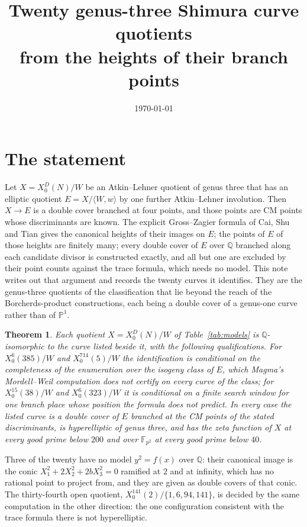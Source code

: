 \documentclass[11pt,reqno]{amsart}
\theoremstyle{plain}
\newtheorem{theorem}{Theorem}
\theoremstyle{definition}
\newcommand{\Q}{\mathbb{Q}}
\newcommand{\F}{\mathbb{F}}
\begin{document}
\title{Twenty genus-three Shimura curve quotients\\ from the heights of their branch points}
\author{}
\date{\today}
\maketitle

\section{The statement}

Let $X=X_0^D(N)/W$ be an Atkin--Lehner quotient of genus three that has an elliptic quotient
$E=X/\langle W,w\rangle$ by one further Atkin--Lehner involution. Then $X\to E$ is a double cover
branched at four points, and those points are CM points whose discriminants are known. The explicit
Gross--Zagier formula of Cai, Shu and Tian gives the canonical heights of their images on $E$; the
points of $E$ of those heights are finitely many; every double cover of $E$ over $\Q$ branched
along each candidate divisor is constructed exactly, and all but one are excluded by their point
counts against the trace formula, which needs no model. This note writes out that argument and
records the twenty curves it identifies. They are the genus-three quotients of the classification
that lie beyond the reach of the Borcherds-product constructions, each being a double cover of a
genus-one curve rather than of $\mathbb P^1$.

\begin{theorem}\label{thm:main}
Each quotient $X=X_0^D(N)/W$ of Table~\ref{tab:models} is $\Q$-isomorphic to the curve listed
beside it, with the following qualifications. For $X_0^6(385)/W$ and $X_0^{714}(5)/W$ the
identification is conditional on the completeness of the enumeration over the isogeny class of $E$,
which Magma's Mordell--Weil computation does not certify on every curve of the class; for
$X_0^{15}(38)/W$ and $X_0^6(323)/W$ it is conditional on a finite search window for one branch place
whose position the formula does not predict. In every case the listed curve is a double cover of $E$
branched at the CM points of the stated discriminants, is hyperelliptic of genus three, and has the
zeta function of $X$ at every good prime below $200$ and over $\F_{p^2}$ at every good prime below
$40$.
\end{theorem}

Three of the twenty have no model $y^2=f(x)$ over $\Q$: their canonical image is the conic
$X_1^2+2X_2^2+2bX_3^2=0$ ramified at $2$ and at infinity, which has no rational point to project
from, and they are given as double covers of that conic. The thirty-fourth open quotient,
$X_0^{141}(2)/\{1,6,94,141\}$, is decided by the same computation in the other direction: the one
configuration consistent with the trace formula there is not hyperelliptic.
\end{document}
